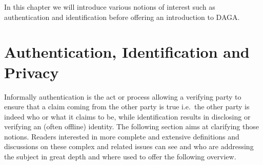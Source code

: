 
    In this chapter we will introduce various notions of interest such as authentication and identification
    before offering an introduction to DAGA.


    \section{Authentication, Identification and Privacy}
    \label{sec:authentication}

    Informally authentication is the act or process allowing a verifying party to ensure that a claim coming from the other party
    is true i.e.\ the other party is indeed who or what it claims to be, while identification results in disclosing or verifying
    an (often offline) identity.
    The following section aims at clarifying those notions.
    Readers interested in more complete and extensive definitions and discussions on
    these complex and related issues can see\cite[p.~13-28]{syta_identity_2015} and
    who are addressing the subject in great depth and where used to offer the following overview.
